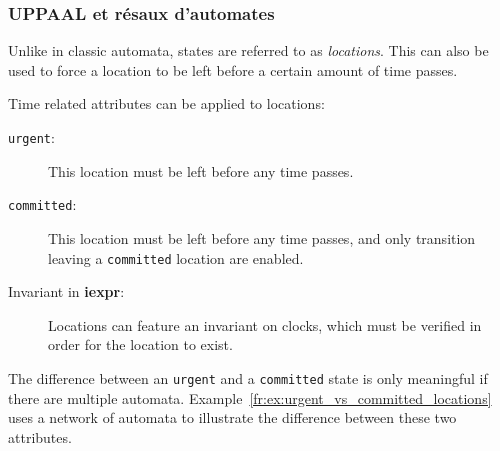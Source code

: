 \subsubsection{UPPAAL et r\'esaux d'automates}
\begin{definition}[Locations]
Unlike in classic automata, states are referred to as \textit{locations}.
This can also be used to force a location to be left
before a certain amount of time passes.
\iffalse
Indeed, without additional constraints
such as an \texttt{urgent} channel synchronization, there is no obligation for
activeable transitions to be taken immediately.
\fi
Time related attributes can be applied to locations:
\begin{description}
\item[\texttt{urgent}:] This location must be left before any time passes.
\item[\texttt{committed}:] This location must be left before any time passes,
and only transition leaving a \texttt{committed} location are enabled.
\item[Invariant in \textbf{iexpr}:] Locations can feature an invariant on
clocks, which must be verified in order for the location to exist.
\end{description}
\end{definition}

The difference between an \texttt{urgent} and a \texttt{committed} state is
only meaningful if there are multiple automata.
Example~\ref{fr:ex:urgent_vs_committed_locations} uses a network of automata to
illustrate the difference between these two attributes.

